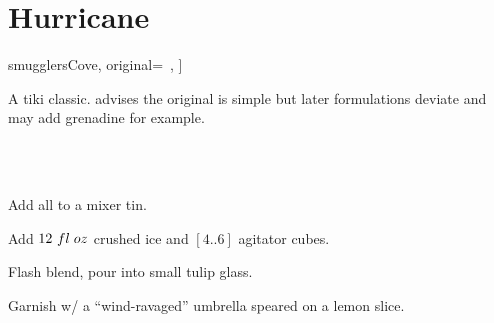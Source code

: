 \section[Hurricane]{Hurricane}


\begin{recipestats}[
	servings=1,
	preptime=5~\minute,
	source=\citeauthor{smugglersCove}~\cite[p.~68]{smugglersCove},
	original=\citeauthor{beachbumBerryRemixed}~\cite{beachbumBerryRemixed},
]
\end{recipestats}


\begin{recipeabstract}
	A tiki classic.
	\citeauthor{smugglersCove} advises the original is simple but later formulations deviate and may add grenadine for example.
\end{recipeabstract}


\begin{ingredientcolumns}[1]
	\begin{ingredientblock}
		\\
		\\
	\end{ingredientblock}
\end{ingredientcolumns}


\begin{preparation}
	\item Add all to a mixer tin.
	\item Add $12~fl\;oz$ crushed ice and $[4..6]$ agitator cubes.
	\item Flash blend, pour into small tulip glass.
	\item Garnish w/ a ``wind-ravaged'' umbrella speared on a lemon slice.
\end{preparation}


\recipeend%

